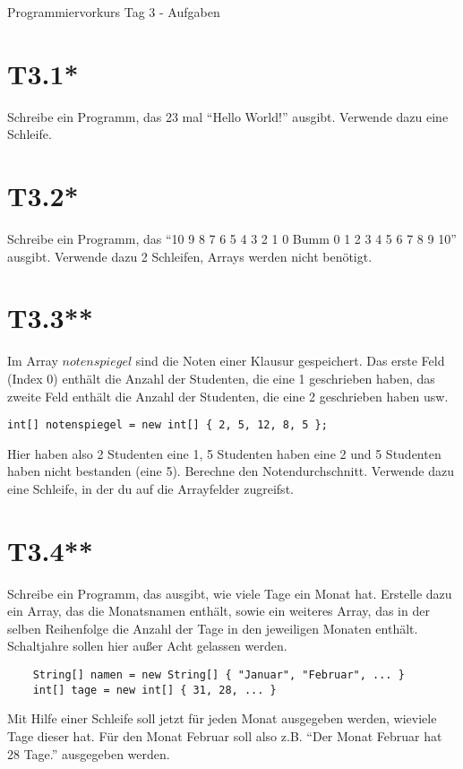 \documentclass[final,a4paper]{article}
\begin{document}


{\huge Programmiervorkurs Tag 3 - Aufgaben}

\bigskip

\section*{T3.1*}
	Schreibe ein Programm, das 23 mal "`Hello World!"' ausgibt. Verwende dazu eine Schleife.

\section*{T3.2*}
	Schreibe ein Programm, das "`10 9 8 7 6 5 4 3 2 1 0 Bumm 0 1 2 3 4 5 6 7 8 9 10"' ausgibt.
	Verwende dazu 2 Schleifen, Arrays werden nicht benötigt.

\section*{T3.3**}
	Im Array $notenspiegel$ sind die Noten einer Klausur gespeichert. Das erste Feld (Index $0$)
	enthält die Anzahl der Studenten, die eine 1 geschrieben haben, das zweite Feld enthält
	die Anzahl der Studenten, die eine 2 geschrieben haben usw.
\begin{lstlisting}
int[] notenspiegel = new int[] { 2, 5, 12, 8, 5 };
\end{lstlisting}
	Hier haben also 2 Studenten eine 1, 5 Studenten haben eine 2 und 5 Studenten haben nicht bestanden (eine 5).
	Berechne den Notendurchschnitt. Verwende dazu eine Schleife, in der du auf die Arrayfelder zugreifst.

\section*{T3.4**}
	Schreibe ein Programm, das ausgibt, wie viele Tage ein Monat hat. Erstelle dazu ein Array,
	das die Monatsnamen enthält, sowie ein weiteres Array, das in der selben Reihenfolge die Anzahl
	der Tage in den jeweiligen Monaten enthält. Schaltjahre sollen hier außer Acht gelassen werden.
	\begin{lstlisting}
	String[] namen = new String[] { "Januar", "Februar", ... }
	int[] tage = new int[] { 31, 28, ... }
	\end{lstlisting}
	Mit Hilfe einer Schleife soll jetzt für jeden Monat ausgegeben werden, wieviele Tage dieser hat.
	Für den Monat Februar soll also z.B. "`Der Monat Februar hat 28 Tage."' ausgegeben werden.
\end{document}
